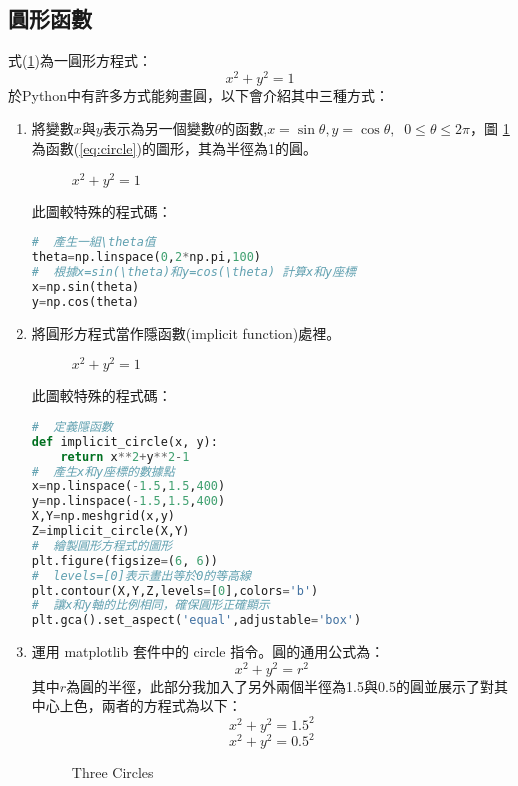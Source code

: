 \subsection{圓形函數}
式(\ref{fig:circle_1})為一圓形方程式：
\begin{equation}\label{eq:circle}
x^2+y^2=1
\end{equation}
於Python中有許多方式能夠畫圓，以下會介紹其中三種方式：
\begin{enumerate}
\item 將變數$x$與$y$表示為另一個變數$\theta$的函數,$x=\sin \theta, y = \cos \theta, \;\; 0 \leq \theta \leq 2\pi$，圖 \ref{fig:circle_1} 為函數(\ref{eq:circle})的圖形，其為半徑為1的圓。\\
\begin{figure}[h]
    \caption{$x^2+y^2=1$}
    \label{fig:circle_1}
\end{figure}
此圖較特殊的程式碼：
\begin{lstlisting}[language=Python]
#  產生一組\theta值
theta=np.linspace(0,2*np.pi,100)
#  根據x=sin(\theta)和y=cos(\theta) 計算x和y座標
x=np.sin(theta)
y=np.cos(theta)
\end{lstlisting}
\item 將圓形方程式當作隱函數(implicit function)處裡。
\begin{figure}[H]
    \caption{$x^2+y^2=1$}
    \label{fig:circle_2}
\end{figure}
此圖較特殊的程式碼：
\begin{lstlisting}[language=Python]
#  定義隱函數
def implicit_circle(x, y):
    return x**2+y**2-1
#  產生x和y座標的數據點
x=np.linspace(-1.5,1.5,400)
y=np.linspace(-1.5,1.5,400)
X,Y=np.meshgrid(x,y)
Z=implicit_circle(X,Y)
#  繪製圓形方程式的圖形
plt.figure(figsize=(6, 6))
#  levels=[0]表示畫出等於0的等高線
plt.contour(X,Y,Z,levels=[0],colors='b')  
#  讓x和y軸的比例相同，確保圓形正確顯示
plt.gca().set_aspect('equal',adjustable='box')  
\end{lstlisting}
\item  運用 matplotlib 套件中的 circle 指令。圓的通用公式為：
$$x^2+y^2=r^2$$
其中$r$為圓的半徑，此部分我加入了另外兩個半徑為1.5與0.5的圓並展示了對其中心上色，兩者的方程式為以下：
$$x^2+y^2=1.5^2$$
$$x^2+y^2=0.5^2$$
\begin{figure}[h]
    \caption{Three Circles}
    \label{fig:circle_3}

\end{figure}
\end{enumerate}
